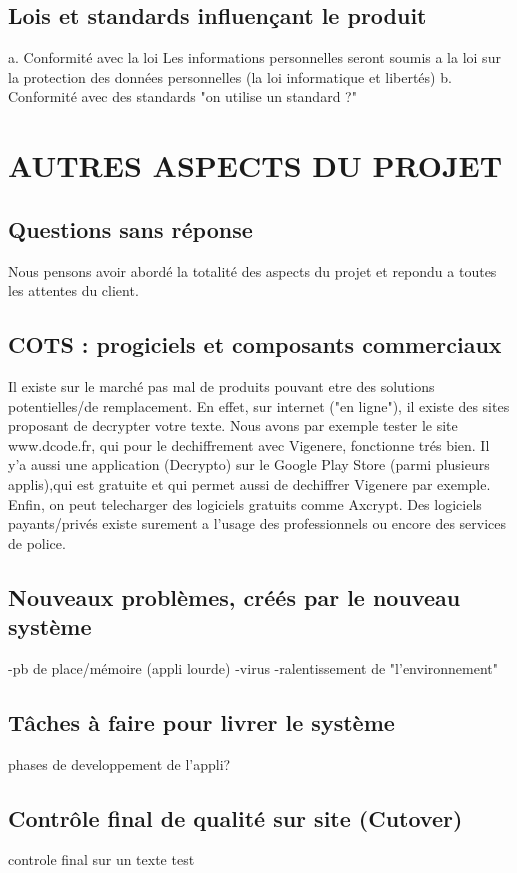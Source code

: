\documentclass[a4]{article}
\begin{document}
		\subsection{Lois et standards influençant le produit}
		a. Conformité avec la loi
Les informations personnelles seront soumis a la loi sur la protection des données
personnelles (la loi informatique et libertés)
		b. Conformité avec des standards
		"on utilise un standard ?"
	\section{AUTRES ASPECTS DU PROJET}
		\subsection{Questions sans réponse}
		Nous pensons avoir abordé la totalité des aspects du projet et repondu a toutes les attentes du client.
		\subsection{COTS : progiciels et composants commerciaux}
		Il existe sur le marché pas mal de produits pouvant etre des solutions potentielles/de remplacement. En effet, sur internet
		("en ligne"), il existe des sites proposant de decrypter votre texte. Nous avons par exemple tester le site www.dcode.fr, qui
		pour le dechiffrement avec Vigenere, fonctionne trés bien.
		Il y'a aussi une application (Decrypto) sur le Google Play Store (parmi plusieurs applis),qui est gratuite et qui permet aussi de dechiffrer Vigenere par exemple.
		Enfin, on peut telecharger des logiciels gratuits comme Axcrypt. Des logiciels payants/privés existe surement a l'usage des
		professionnels ou encore des services de police.
		\subsection{Nouveaux problèmes, créés par le nouveau système}
		-pb de place/mémoire (appli lourde)
		-virus
		-ralentissement de "l'environnement"
		\subsection{Tâches à faire pour livrer le système}
		phases de developpement de l'appli?
		\subsection{Contrôle final de qualité sur site (Cutover)}
		controle final sur un texte test
\end{document}
